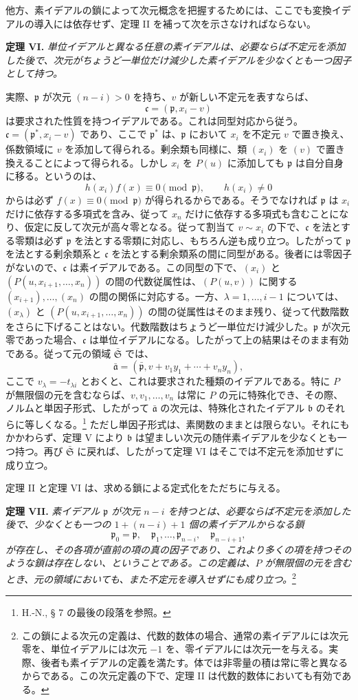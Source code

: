 \documentclass[11pt]{article}
\providecommand{\frakS}{\mathfrak S}
\providecommand{\frakp}{\mathfrak p}
\providecommand{\fraka}{\mathfrak a}
\providecommand{\frakb}{\mathfrak b}
\providecommand{\frakc}{\mathfrak c}
\providecommand{\frakp}{\mathfrak p}
\begin{document}
他方、素イデアルの鎖によって次元概念を把握するためには、ここでも変換イデアルの導入には依存せず、定理 II を補って次を示さなければならない。

\textbf{定理 VI.} \emph{単位イデアルと異なる任意の素イデアルは、必要ならば不定元を添加した後で、次元がちょうど一単位だけ減少した素イデアルを少なくとも一つ因子として持つ。}

実際、$\frakp$ が次元 $(n-i)>0$ を持ち、$v$ が新しい不定元を表すならば、
\[
 \frakc=(\frakp,x_i-v)
\]
は要求された性質を持つイデアルである。これは同型対応から従う。$\frakc=(\frakp^*,x_i-v)$ であり、ここで $\frakp^*$ は、$\frakp$ において $x_i$ を不定元 $v$ で置き換え、係数領域に $v$ を添加して得られる。剰余類も同様に、類 $(x_i)$ を $(v)$ で置き換えることによって得られる。しかし $x_i$ を $P(u)$ に添加しても $\frakp$ は自分自身に移る。というのは、
\[
 h(x_i)f(x)\equiv0\pmod{\frakp},\qquad h(x_i)\ne0
\]
からは必ず $f(x)\equiv0\pmod{\frakp}$ が得られるからである。そうでなければ $\frakp$ は $x_i$ だけに依存する多項式を含み、従って $x_n$ だけに依存する多項式も含むことになり、仮定に反して次元が高々零となる。従って割当て $v\sim x_i$ の下で、$\frakc$ を法とする零類は必ず $\frakp$ を法とする零類に対応し、もちろん逆も成り立つ。したがって $\frakp$ を法とする剰余類系と $\frakc$ を法とする剰余類系の間に同型がある。後者には零因子がないので、$\frakc$ は素イデアルである。この同型の下で、$(x_i)$ と $(P(u,x_{i+1},\ldots,x_n))$ の間の代数従属性は、$(P(u,v))$ に関する $(x_{i+1}),\ldots,(x_n)$ の間の関係に対応する。一方、$\lambda=1,\ldots,i-1$ については、$(x_\lambda)$ と $(P(u,x_{i+1},\ldots,x_n))$ の間の従属性はそのまま残り、従って代数階数をさらに下げることはない。代数階数はちょうど一単位だけ減少した。$\frakp$ が次元零であった場合、$\frakc$ は単位イデアルになる。したがって上の結果はそのまま有効である。従って元の領域 $\bar{\frakS}$ では、
\[
 \bar{\fraka}=(\bar{\frakp},v+v_1y_1+\cdots+v_ny_n),
\]
ここで $v_\lambda=-t_{\lambda i}$ とおくと、これは要求された種類のイデアルである。特に $P$ が無限個の元を含むならば、$v,v_1,\ldots,v_n$ は常に $P$ の元に特殊化でき、その際、ノルムと単因子形式、したがって $\bar{\fraka}$ の次元は、特殊化されたイデアル $\frakb$ のそれらに等しくなる。\footnote{H.-N., § 7 の最後の段落を参照。} ただし単因子形式は、素関数のままとは限らない。それにもかかわらず、定理 V により $\frakb$ は望ましい次元の随伴素イデアルを少なくとも一つ持つ。再び $\bar{\frakS}$ に戻れば、したがって定理 VI はそこでは不定元を添加せずに成り立つ。

定理 II と定理 VI は、求める鎖による定式化をただちに与える。

\textbf{定理 VII.} \emph{素イデアル $\frakp$ が次元 $n-i$ を持つとは、必要ならば不定元を添加した後で、少なくとも一つの $1+(n-i)+1$ 個の素イデアルからなる鎖}
\[
 \frakp_0=\frakp,\quad \frakp_1,\ldots,\frakp_{n-i},\quad \frakp_{n-i+1},
\]
\emph{が存在し、その各項が直前の項の真の因子であり、これより多くの項を持つそのような鎖は存在しない、ということである。この定義は、$P$ が無限個の元を含むとき、元の領域においても、また不定元を導入せずにも成り立つ。}\footnote{この鎖による次元の定義は、代数的数体の場合、通常の素イデアルには次元零を、単位イデアルには次元 $-1$ を、零イデアルには次元一を与える。実際、後者も素イデアルの定義を満たす。体では非零量の積は常に零と異なるからである。この次元定義の下で、定理 II は代数的数体においても有効である。}
\end{document}
